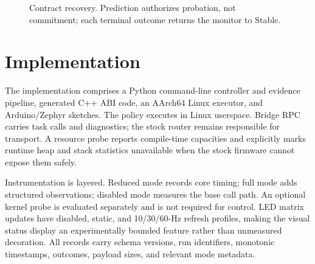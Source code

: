 \documentclass[conference]{IEEEtran}
\begin{document}
\begin{figure}[t]
\centering
{}
\caption{Contract recovery. Prediction authorizes probation, not commitment;
each terminal outcome returns the monitor to Stable.}
\label{fig:state}
\end{figure}

\section{Implementation}
The implementation comprises a Python command-line controller and evidence
pipeline, generated C++ ABI code, an AArch64 Linux executor, and Arduino/Zephyr
sketches. The policy executes in Linux userspace. Bridge RPC carries task calls
and diagnostics; the stock router remains responsible for transport. A
resource probe reports compile-time capacities and explicitly marks runtime
heap and stack statistics unavailable when the stock firmware cannot expose
them safely.

Instrumentation is layered. Reduced mode records core timing; full mode adds
structured observations; disabled mode measures the base call path. An optional
kernel probe is evaluated separately and is not required for control. LED matrix
updates have disabled, static, and 10/30/60-Hz refresh profiles, making the
visual status display an experimentally bounded feature rather than unmeasured
decoration. All records carry schema versions, run identifiers, monotonic
timestamps, outcomes, payload sizes, and relevant mode metadata.
\end{document}
